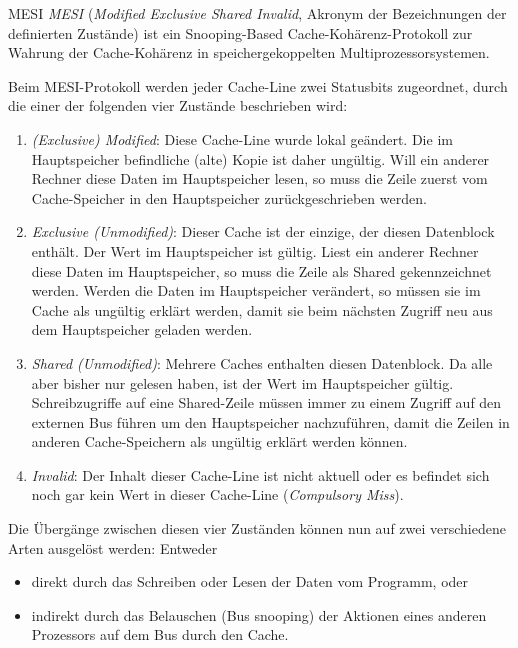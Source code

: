 \begin{example}{MESI}
    \emph{MESI} (\emph{Modified Exclusive Shared Invalid}, Akronym der Bezeichnungen der definierten Zustände) ist ein Snooping-Based Cache-Kohärenz-Protokoll zur Wahrung der Cache-Kohärenz in speichergekoppelten Multiprozessorsystemen.

    Beim MESI-Protokoll werden jeder Cache-Line zwei Statusbits zugeordnet, durch die einer der folgenden vier Zustände beschrieben wird:
    \begin{enumerate}
        \item \emph{(Exclusive) Modified}:
              Diese Cache-Line wurde lokal geändert.
              Die im Hauptspeicher befindliche (alte) Kopie ist daher ungültig.
              Will ein anderer Rechner diese Daten im Hauptspeicher lesen, so muss die Zeile zuerst vom Cache-Speicher in den Hauptspeicher zurückgeschrieben werden.
        \item \emph{Exclusive (Unmodified)}:
              Dieser Cache ist der einzige, der diesen Datenblock enthält.
              Der Wert im Hauptspeicher ist gültig.
              Liest ein anderer Rechner diese Daten im Hauptspeicher, so muss die Zeile als Shared gekennzeichnet werden.
              Werden die Daten im Hauptspeicher verändert, so müssen sie im Cache als ungültig erklärt werden, damit sie beim nächsten Zugriff neu aus dem Hauptspeicher geladen werden.
        \item \emph{Shared (Unmodified)}:
              Mehrere Caches enthalten diesen Datenblock.
              Da alle aber bisher nur gelesen haben, ist der Wert im Hauptspeicher gültig.
              Schreibzugriffe auf eine Shared-Zeile müssen immer zu einem Zugriff auf den externen Bus führen um den Hauptspeicher nachzuführen, damit die Zeilen in anderen Cache-Speichern als ungültig erklärt werden können.
        \item \emph{Invalid}:
              Der Inhalt dieser Cache-Line ist nicht aktuell oder es befindet sich noch gar kein Wert in dieser Cache-Line (\emph{Compulsory Miss}).
    \end{enumerate}

    Die Übergänge zwischen diesen vier Zuständen können nun auf zwei verschiedene Arten ausgelöst werden:
    Entweder
    \begin{itemize}
        \item direkt durch das Schreiben oder Lesen der Daten vom Programm, oder
        \item indirekt durch das Belauschen (Bus snooping) der Aktionen eines anderen Prozessors auf dem Bus durch den Cache.
    \end{itemize}


\end{example}

